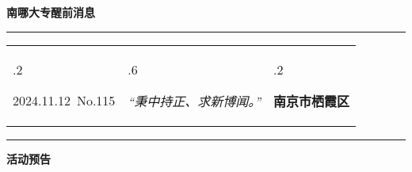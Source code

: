 \documentclass[letterpaper, 12pt]{article}
\begin{document}
\begin{center}
    \Huge\textbf{南哪大专醒前消息}
\end{center}
\vspace{4mm}
\hrule
\renewcommand\tabularxcolumn[1]{m{#1}}
\begin{tabularx}{\textwidth}{>{\hsize.2\hsize}X>{\hsize.6\hsize}X>{\hsize.2\hsize}X}
    \begin{flushleft}
        2024.11.12\, No.115
    \end{flushleft}
    &
    \begin{center}
        \textit{“秉中持正、求新博闻。”}
    \end{center}
    &
    \begin{flushright}
        \textbf{南京市栖霞区}
    \end{flushright}
\end{tabularx}
\vspace{-3.5mm}
\hrule
\vspace{4mm}
\centerline{\huge\textbf{活动预告}}
\end{document}
